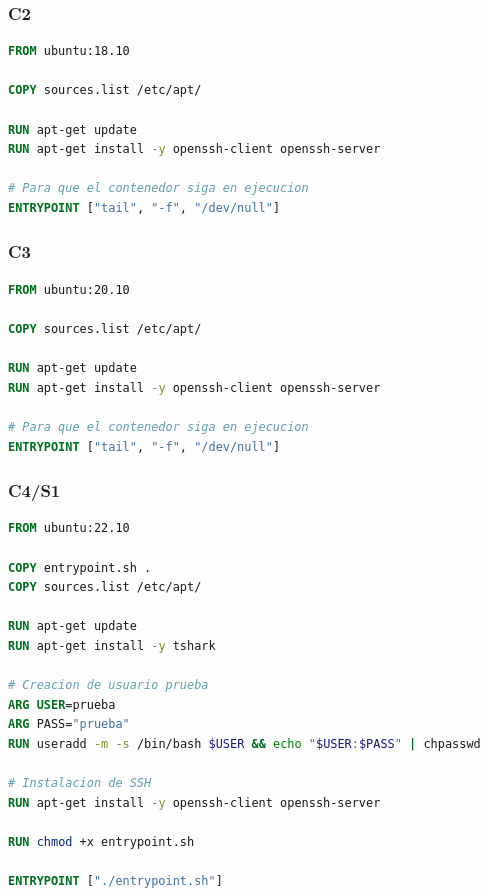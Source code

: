 \documentclass[letter,12pt]{article}
\newcounter{codecount}
\begin{document}
\subsubsection{C2}

\label{code:C2}
\begin{lstlisting}[language=Dockerfile, caption={C2}]
FROM ubuntu:18.10

COPY sources.list /etc/apt/

RUN apt-get update
RUN apt-get install -y openssh-client openssh-server

# Para que el contenedor siga en ejecucion
ENTRYPOINT ["tail", "-f", "/dev/null"]
\end{lstlisting}

\subsubsection{C3}

\label{code:C3}
\begin{lstlisting}[language=Dockerfile, caption={C3}]
FROM ubuntu:20.10

COPY sources.list /etc/apt/

RUN apt-get update
RUN apt-get install -y openssh-client openssh-server

# Para que el contenedor siga en ejecucion
ENTRYPOINT ["tail", "-f", "/dev/null"]
\end{lstlisting}

\subsubsection{C4/S1}

\label{code:C4}
\begin{lstlisting}[language=Dockerfile, caption={C4}]
FROM ubuntu:22.10

COPY entrypoint.sh .
COPY sources.list /etc/apt/

RUN apt-get update
RUN apt-get install -y tshark

# Creacion de usuario prueba
ARG USER=prueba
ARG PASS="prueba"
RUN useradd -m -s /bin/bash $USER && echo "$USER:$PASS" | chpasswd

# Instalacion de SSH
RUN apt-get install -y openssh-client openssh-server

RUN chmod +x entrypoint.sh

ENTRYPOINT ["./entrypoint.sh"]
\end{lstlisting}
\end{document}
